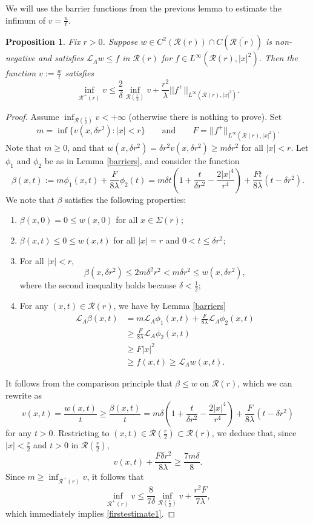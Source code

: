 \documentclass[12pt]{amsart}
\newtheorem{Proposition}[Theorem]{Proposition}
\newcommand{\Lop}{\mathcal{L}}
\def \r {\mathcal R}
\begin{document}
We will use the barrier functions from the previous lemma to estimate the infimum of $v =\frac{u}{t}$.

\begin{Proposition}\label{firstestimate}
Fix $r>0$. Suppose $w \in C^2(\r(r))\cap C(\overline{\r(r)})$ is non-negative and satisfies $\Lop_A w \leq f$ in $\r(r)$ for $f \in L^{\infty}(\r(r),|x|^2)$. Then the function $v:= \frac{w}{t}$ satisfies
\begin{equation}\label{firstestimate1}
\inf_{\r^+(r)} v \leq \frac{2}{\delta} \inf_{\r(\frac{r}{2})} v + \frac{r^2}{\lambda}||f^+||_{L^{\infty}(\r(r),|x|^2)}.
\end{equation}
\end{Proposition}
\begin{proof}
Assume $\inf_{\r(\frac{r}{2})} v<+\infty$ (otherwise there is nothing to prove). Set 
$$m = \inf\{v(x,\delta r^2) : |x| < r \} \qquad \text{and} \qquad F = ||f^+||_{L^{\infty}(\r(r),|x|^2)}.$$
Note that $m \geq 0$, and that $w(x,\delta r^2) = \delta r^2 v(x,\delta r^2) \geq m \delta r^2$ for all $|x| < r$. Let $\phi_1$ and $\phi_2$ be as in Lemma \ref{barriers}, and consider the function
$$\beta(x,t) := m \phi_1(x,t) + \frac{F}{8 \lambda} \phi_2(t) = m \delta t\left(1 + \frac{t}{\delta r^2} -\frac{2|x|^4}{r^4}\right) +  \frac{F t}{8 \lambda} \left(t - \delta r^2 \right). $$
We note that $\beta$ satisfies the following properties:
\begin{enumerate}
\item[(i)] $\beta(x,0) = 0 \leq w(x,0)$ for all $x \in \Sigma(r)$;
\item[(ii)] $\beta(x,t) \leq 0 \leq w(x,t)$ for all $|x| = r$ and $0 < t \leq \delta r^2$;
\item[(iii)] For all $|x|< r$,
\[\beta(x,\delta r^2) \leq 2 m \delta^2 r^2 < m \delta r^2 \leq w(x,\delta r^2),\]
where the second inequality holds because $\delta < \frac{1}{2}$;
\item[(iv)] For any $(x,t) \in \r(r)$, we have by Lemma \ref{barriers}
\begin{align*}
\Lop_A \beta (x,t) & = m \Lop_A \phi_1 (x,t) + \frac{F}{8\lambda} \Lop_A \phi_2 (x,t)\\
& \geq \frac{F}{8\lambda} \Lop_A \phi_2 (x,t) \\
& \geq F |x|^2\\
& \geq f(x,t) \geq \Lop_A w(x,t).
\end{align*}
\end{enumerate}
It follows from the comparison principle that $\beta \leq w$ on $\r(r)$, which we can rewrite as
$$
v(x,t)=\frac{w(x,t)}{t} \geq \frac{\beta(x,t)}{t} = m \delta \left(1 + \frac{t}{\delta r^2} -\frac{2|x|^4}{r^4}\right) +  \frac{F}{8 \lambda} \left(t - \delta r^2 \right) 
$$
for any $t>0$. Restricting to $(x,t) \in \r(\frac{r}{2}) \subset \r(r)$, we deduce that, since $|x| < \frac{r}{2}$ and $t > 0$ in $\r(\frac{r}{2})$, 
$$
 v(x,t) +  \frac{F \delta r^2}{8 \lambda}  \geq \frac{7m \delta}{8}.
$$
Since $m \geq \inf_{ \r^+(r)} v$, it follows that 
$$
\inf_{\r^+(r)} v \leq \frac{8}{7\delta} \inf_{\r(\frac{r}{2})} v + \frac{r^2 F}{7\lambda},
$$
which immediately implies \eqref{firstestimate1}.
\end{proof}
\end{document}
